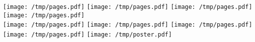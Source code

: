 \documentclass[a4paper,landscape]{article}
\begin{document}
\texttt{[image: /tmp/pages.pdf]}\hfill
\texttt{[image: /tmp/pages.pdf]}\hfill
\texttt{[image: /tmp/pages.pdf]}\hfill
\texttt{[image: /tmp/pages.pdf]}\\
\texttt{[image: /tmp/pages.pdf]}\hfill
\texttt{[image: /tmp/pages.pdf]}\hfill
\texttt{[image: /tmp/pages.pdf]}\hfill
\texttt{[image: /tmp/pages.pdf]}\hfill
\newline
\texttt{[image: /tmp/poster.pdf]}\hfill
\end{document}
